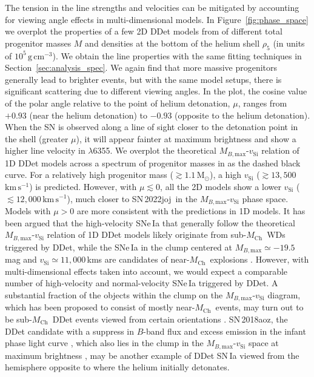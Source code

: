 \documentclass[twocolumn]{aastex631}
\newcommand{\sn}{SN\,2022joj}
\newcommand{\Mch}{$M_\mathrm{Ch}$}
\newcommand{\kms}{$\mathrm{km}\,\mathrm{s}^{-1}$}
\begin{document}
\begin{CJK*}{UTF8}{gbsn}
The tension in the line strengths and velocities can be mitigated by accounting for viewing angle effects in multi-dimensional models. In Figure~\ref{fig:phase_space} we overplot the properties of a few 2D DDet models from \citet{Shen_2D_2021} of different total progenitor masses $M$ and densities at the bottom of the helium shell $\rho_5$ (in units of $\mathrm{10^5\,g\,cm^{-3}}$). We obtain the  line properties with the same fitting techniques in Section~\ref{sec:analysis_spec}. We again find that more massive progenitors generally lead to brighter events, but with the same model setups, there is significant scattering due to different viewing angles. In the plot, the cosine value of the polar angle relative to the point of helium detonation, $\mu$, ranges from $+0.93$ (near the helium detonation) to $-0.93$ (opposite to the helium detonation). When the SN is observed along a line of sight closer to the detonation point in the shell (greater $\mu$), it will appear fainter at maximum brightness and show a higher line velocity in  $\lambda$6355. We overplot the theoretical $M_{B,\mathrm{max}}$-$v_\mathrm{Si}$ relation of 1D DDet models across a spectrum of progenitor masses in \citet{polin_observational_2019} as the dashed black curve. For a relatively high progenitor mass ($\gtrsim$$1.1\,\mathrm{M_\odot}$), a high $v_\mathrm{Si}$ ($\gtrsim$$13,500$\,\kms) is predicted. However, with $\mu\lesssim0$, all the 2D models show a lower $v_\mathrm{Si}$ ($\lesssim$$12,000$\,\kms), much closer to \sn\ in the $M_{B,\mathrm{max}}$-$v_\mathrm{Si}$ phase space. Models with $\mu>0$ are more consistent with the predictions in 1D models. It has been argued that the high-velocity SNe\,Ia that generally follow the theoretical $M_{B,\mathrm{max}}$-$v_\mathrm{Si}$ relation of 1D DDet models likely originate from sub-\Mch\ WDs triggered by DDet, while the SNe\,Ia in the clump centered at $M_{B,\mathrm{max}}\simeq-19.5$\,mag and $v_\mathrm{Si}\simeq11,000$\,kms are candidates of near-\Mch\ explosions \citep{polin_observational_2019,Nugent_2023}. However, with multi-dimensional effects taken into account, we would expect a comparable number of high-velocity and normal-velocity SNe\,Ia triggered by DDet. A substantial fraction of the objects within the clump on the $M_{B,\mathrm{max}}$-$v_\mathrm{Si}$ diagram, which has been proposed to consist of mostly near-\Mch\ events, may turn out to be sub-\Mch\ DDet events viewed from certain orientations \citep{Shen_2D_2021}. SN\,2018aoz, the DDet candidate with a suppress in $B$-band flux and excess emission in the infant phase light curve \citep{Ni_2022}, which also lies in the clump in the $M_{B,\mathrm{max}}$-$v_\mathrm{Si}$ space at maximum brightness \citep{Ni_18aoz_2023}, may be another example of DDet SN\,Ia viewed from the hemisphere opposite to where the helium initially detonates.


\end{CJK*}
\end{document}
